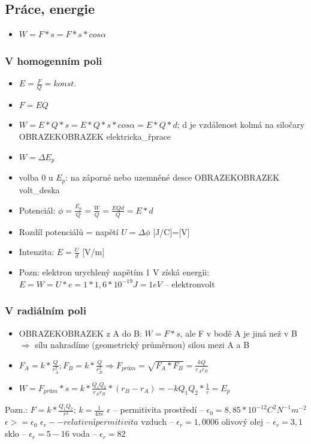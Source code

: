 \documentclass{article}
\begin{document}
\subsection{Práce, energie}
\begin{itemize}
  \item $W = F*s = F*s*cos \alpha $
\end{itemize}
\subsubsection{V homogenním poli}
\begin{itemize}
  \item $E = \frac{F}{Q} = konst.$
  \item $F = EQ$
  \item $W = E*Q*s = E*Q*s*cos\alpha = E*Q*d$; d je vzdálenost kolmá na siločary OBRAZEKOBRAZEK elektricka_řprace
  \item $W = \Delta E_p$
  \item volba 0 u $E_p$: na záporné nebo uzemněné desce OBRAZEKOBRAZEK volt_deska
  \item Potenciál: $\phi = \frac{E_p}{Q} = \frac{W}{Q} = \frac{EQd}{Q} = E*d$
  \item Rozdíl potenciálů = napětí $U = \Delta \phi$ [J/C]=[V]
  \item Intenzita: $E=\frac{U}{d}$ [V/m]
  \item Pozn: elektron urychlený napětím 1 V získá energii: $E = W = U*e = 1*1,6*10^{-19}J = 1 eV$ -- elektronvolt
\end{itemize}
\subsubsection{V radiálním poli}
\begin{itemize}
  \item OBRAZEKOBRAZEK z A do B: $W = F*s$, ale F v bodě A je jiná než v B $\Rightarrow$ sílu nahradíme  (geometrický průměrnou) silou mezi A a B
  \item $F_A = k*\frac{Q}{r_A^2}; F_B = k*\frac{Q}{r_B^2} \Rightarrow F_{prům} = \sqrt{F_A*F_B} = \frac{kQ}{r_A r_B}$
  \item $W=F_{prům}*s = k*\frac{Q_1 Q_2}{r_A r_B}*(r_B-r_A) = -kQ_1 Q_2*\frac{1}{r} = E_p$
\end{itemize}
Pozn.: $F = k*\frac{Q_1 Q_2}{r^2}$; $k = \frac{1}{4 \pi \epsilon}$
$\epsilon$ -- permitivita prostředí -- 
$\epsilon_0 = 8,85 * 10^{-12} C^2 N^{-1} m^{-2}$
$\epsilon >= \epsilon_0$
$\epsilon_r -- relativní permitivita$
vzduch -- $\epsilon_r = 1,0006$
olivový olej -- $\epsilon_r = 3,1$
sklo -- $\epsilon_r = 5-16$
voda -- $\epsilon_r = 82$
\end{document}
